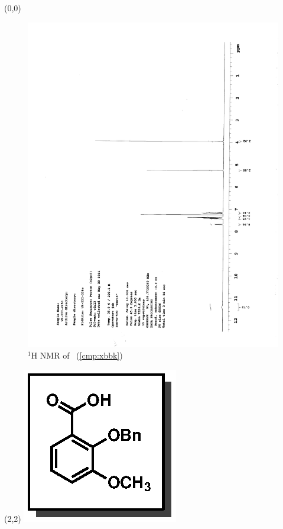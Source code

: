 \begin{textblock}{20}(0,0)
\begin{figure}[htb]
\caption{$^1$H NMR of \CMPxbbk\ (\ref{cmp:xbbk})}
\includegraphics[scale=0.75, trim = 0mm 0mm 0mm 5mm,
clip]{chp_singlecarbon/images/nmr/xbbkH}
\vspace{-100pt}
\end{figure}
\end{textblock}
\begin{textblock}{1}(2,2)
\includegraphics[scale=0.8, angle=90]{chp_singlecarbon/images/xbbk}
\end{textblock}
